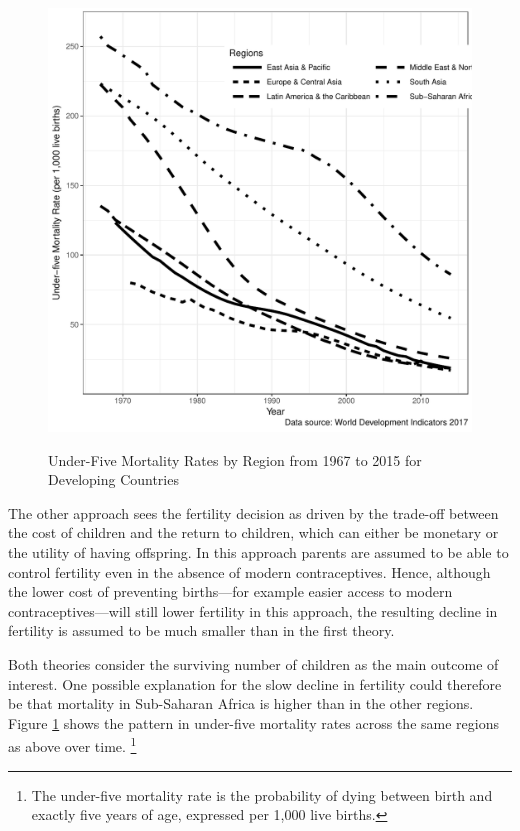 \documentclass[letterpaper,12pt]{article}
\begin{document}
\begin{figure}[hp!]
    \centering
    \caption{Under-Five Mortality Rates by Region from 1967 to 2015 for Developing Countries}
    \includegraphics[width=0.95\linewidth]{../figures/childMortalityRatesBW.pdf}
    \label{fig:mortality}
\end{figure}

The other approach sees the fertility decision as driven by the
trade-off between the cost of children and the return to children, which
can either be monetary or the utility of having offspring. 
In this approach parents are assumed to be able to control fertility
even in the absence of modern contraceptives. 
Hence, although the lower cost of preventing births---for example easier
access to modern contraceptives---will still lower fertility in this
approach, the resulting decline in fertility is assumed to be much
smaller than in the first theory.

Both theories consider the surviving number of children as the main
outcome of interest. 
One possible explanation for the slow decline in fertility could
therefore be that mortality in Sub-Saharan Africa is higher than in the
other regions. 
Figure \ref{fig:mortality} shows the pattern in under-five mortality
rates across the same regions as above over time.%
\footnote{
The under-five mortality rate is the probability of dying between birth
and exactly five years of age, expressed per 1,000 live births.
}
\end{document}
